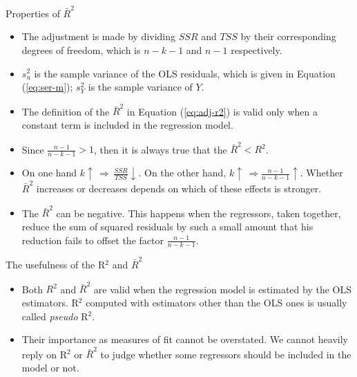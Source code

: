 \documentclass[presentation,10pt]{beamer}
\begin{document}
\begin{frame}[label={sec:org1e29749}]{Properties of \(\bar{R}^2\)}
\begin{itemize}
\item The adjustment is made by dividing \(SSR\) and \(TSS\) by their
corresponding degrees of freedom, which is \(n-k-1\) and \(n-1\)
respectively.
\item \(s^2_u\) is the sample variance of the OLS residuals, which is given
in Equation (\ref{eq:ser-m}); \(s^2_Y\) is the sample variance of \(Y\).
\item The definition of the \(\bar{R}^2\) in Equation (\ref{eq:adj-r2}) is
valid only when a constant term is included in the regression
model.
\item Since \(\frac{n-1}{n-k-1} > 1\), then it is always true that
the \(\bar{R}^2 < R^2\).
\item On one hand \(k \uparrow\, \Rightarrow\, \frac{SSR}{TSS} \downarrow\). On
the other hand, \(k \uparrow\, \Rightarrow \frac{n-1}{n-k-1}
  \uparrow\). Whether \(\bar{R}^2\) increases or decreases depends on
which of these effects is stronger.
\item The \(\bar{R}^2\) can be negative. This happens when the regressors,
taken together, reduce the sum of squared residuals by such a small
amount that his reduction fails to offset the factor \(\frac{n-1}{n-k-1}\).
\end{itemize}
\end{frame}

\begin{frame}[label={sec:orga5e9e6a}]{The usefulness of the R\(^{\text{2}}\) and \(\bar{R}^2\)}
\begin{itemize}
\item Both \(R^2\) and \(\bar{R}^2\) are valid when the regression model is
estimated by the OLS estimators. R\(^{\text{2}}\) computed with estimators other
than the OLS ones is usually called \emph{pseudo} R\(^{\text{2}}\).
\item Their importance as measures of fit cannot be overstated. We cannot heavily
reply on R\(^{\text{2}}\) or \(\bar{R}^2\) to judge whether some regressors should
be included in the model or not.
\end{itemize}
\end{frame}
\end{document}
